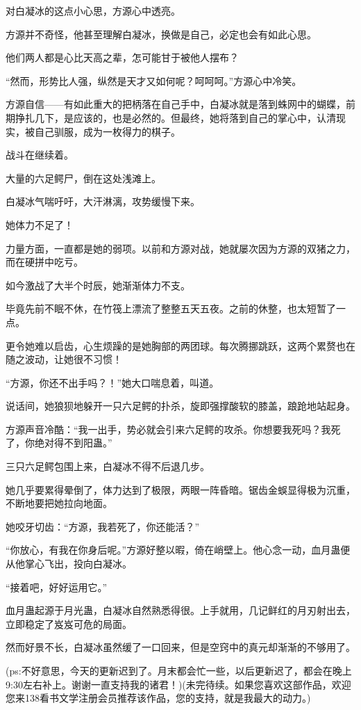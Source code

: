 \begin{this_body}
对白凝冰的这点小心思，方源心中透亮。

方源并不奇怪，他甚至理解白凝冰，换做是自己，必定也会有如此心思。

他们两人都是心比天高之辈，怎可能甘于被他人摆布？

“然而，形势比人强，纵然是天才又如何呢？呵呵呵。”方源心中冷笑。

方源自信——有如此重大的把柄落在自己手中，白凝冰就是落到蛛网中的蝴蝶，前期挣扎几下，是应该的，也是必然的。但最终，她将落到自己的掌心中，认清现实，被自己驯服，成为一枚得力的棋子。

战斗在继续着。

大量的六足鳄尸，倒在这处浅滩上。

白凝冰气喘吁吁，大汗淋漓，攻势缓慢下来。

她体力不足了！

力量方面，一直都是她的弱项。以前和方源对战，她就屡次因为方源的双猪之力，而在硬拼中吃亏。

如今激战了大半个时辰，她渐渐体力不支。

毕竟先前不眠不休，在竹筏上漂流了整整五天五夜。之前的休整，也太短暂了一点。

更令她难以启齿，心生烦躁的是她胸部的两团球。每次腾挪跳跃，这两个累赘也在随之波动，让她很不习惯！

“方源，你还不出手吗？！”她大口喘息着，叫道。

说话间，她狼狈地躲开一只六足鳄的扑杀，旋即强撑酸软的膝盖，踉跄地站起身。

方源声音冷酷：“我一出手，势必就会引来六足鳄的攻杀。你想要我死吗？我死了，你绝对得不到阳蛊。”

三只六足鳄包围上来，白凝冰不得不后退几步。

她几乎要累得晕倒了，体力达到了极限，两眼一阵昏暗。锯齿金蜈显得极为沉重，不断地要把她拉向地面。

她咬牙切齿：“方源，我若死了，你还能活？”

“你放心，有我在你身后呢。”方源好整以暇，倚在峭壁上。他心念一动，血月蛊便从他掌心飞出，投向白凝冰。

“接着吧，好好运用它。”

血月蛊起源于月光蛊，白凝冰自然熟悉得很。上手就用，几记鲜红的月刃射出去，立即稳定了岌岌可危的局面。

然而好景不长，白凝冰虽然缓了一口回来，但是空窍中的真元却渐渐的不够用了。

(ps:不好意思，今天的更新迟到了。月末都会忙一些，以后更新迟了，都会在晚上9:30左右补上。谢谢一直支持我的诸君！)(未完待续。如果您喜欢这部作品，欢迎您来138看书文学注册会员推荐该作品，您的支持，就是我最大的动力。)

\end{this_body}

